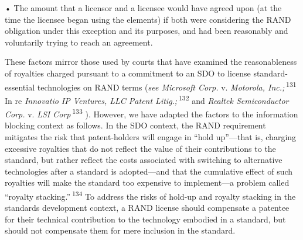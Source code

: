 \documentclass[twoside,11pt]{article}
\begin{document}
          • The amount that a licensor and a licensee would have agreed upon (at the time the licensee began using the elements) if both were considering the RAND obligation under this exception and its purposes, and had been reasonably and voluntarily trying to reach an agreement.



          These factors mirror those used by courts that have examined the reasonableness of royalties charged pursuant to a commitment to an SDO to license standard-essential technologies on RAND terms (\emph{see Microsoft Corp.} v. \emph{Motorola, Inc.;} \textsuperscript{131}
             In re \emph{Innovatio IP Ventures, LLC Patent Litig.;} \textsuperscript{132}
             and \emph{Realtek Semiconductor Corp.} v. \emph{LSI Corp} \textsuperscript{133}
            ). However, we have adapted the factors to the information blocking context as follows. In the SDO context, the RAND requirement mitigates the risk that patent-holders will engage in “hold up”—that is, charging excessive royalties that do not reflect the value of their contributions to the standard, but rather reflect the costs associated with switching to alternative technologies after a standard is adopted—and that the cumulative effect of such royalties will make the standard too expensive to implement—a problem called “royalty stacking.” \textsuperscript{134}
             To address the risks of hold-up and royalty stacking in the standards development context, a RAND license should compensate a patentee for their technical contribution to the technology embodied in a standard, but should not compensate them for mere inclusion in the standard.








\end{document}
